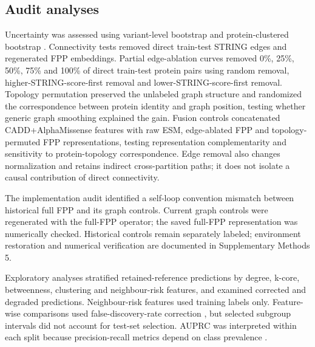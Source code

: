 \documentclass[conference]{IEEEtran}
\newcommand{\CADDAM}{CADD\allowbreak{}+\allowbreak{}AlphaMissense}
\begin{document}
\subsection{Audit analyses}

Uncertainty was assessed using variant-level bootstrap and protein-clustered bootstrap \cite{Efron1993Bootstrap}. Connectivity tests removed direct train-test STRING edges and regenerated FPP embeddings. Partial edge-ablation curves removed 0\%, 25\%, 50\%, 75\% and 100\% of direct train-test protein pairs using random removal, higher-STRING-score-first removal and lower-STRING-score-first removal. Topology permutation preserved the unlabeled graph structure and randomized the correspondence between protein identity and graph position, testing whether generic graph smoothing explained the gain. Fusion controls concatenated \CADDAM{} features with raw ESM, edge-ablated FPP and topology-permuted FPP representations, testing representation complementarity and sensitivity to protein-topology correspondence. Edge removal also changes normalization and retains indirect cross-partition paths; it does not isolate a causal contribution of direct connectivity.

The implementation audit identified a self-loop convention mismatch between historical full FPP and its graph controls. Current graph controls were regenerated with the full-FPP operator; the saved full-FPP representation was numerically checked. Historical controls remain separately labeled; environment restoration and numerical verification are documented in Supplementary Methods 5.

Exploratory analyses stratified retained-reference predictions by degree, k-core, betweenness, clustering and neighbour-risk features, and examined corrected and degraded predictions. Neighbour-risk features used training labels only. Feature-wise comparisons used false-discovery-rate correction \cite{Benjamini1995FDR}, but selected subgroup intervals did not account for test-set selection. AUPRC was interpreted within each split because precision-recall metrics depend on class prevalence \cite{Saito2015PrecisionRecall}.
\end{document}
